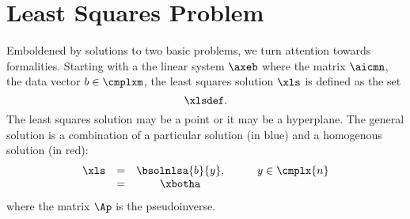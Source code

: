 \section{\label{sec:lsp}Least Squares Problem}  %
Emboldened by solutions to two basic problems, we turn attention towards formalities. Starting with a the linear system $\axeb$ where the matrix $\aicmn$, the data vector $b\in\cmplxm$, the least squares solution $\xls$ is defined as the set
  \begin{equation}   %
    \xlsdef .
    \label{eq:xlsdef}
  \end{equation}
The least squares solution may be a point or it may be a hyperplane. The general solution is a combination of a particular solution (in blue) and a homogenous solution (in red):
  \begin{equation}   %
   \begin{array}{cccccl}
     \xls 
       & = & \bsolnlsa{b}{y}, & \qquad y \in \cmplx{n} \\
       & = & \xbotha
    \label{eq:general soln}
   \end{array}
  \end{equation}
where the matrix $\Ap$ is the pseudoinverse.


\endinput